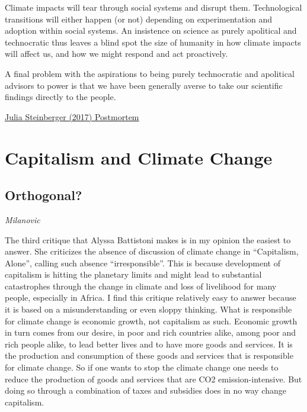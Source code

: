 \documentclass[
]{book}
\begin{document}
Climate impacts will tear through social systems and disrupt them. Technological transitions will either happen (or not) depending on experimentation and adoption within social systems. An insistence on science as purely apolitical and technocratic thus leaves a blind spot the size of humanity in how climate impacts will affect us, and how we might respond and act proactively.

A final problem with the aspirations to being purely technocratic and apolitical advisors to power is that we have been generally averse to take our scientific findings directly to the people.

\href{https://medium.com/age-of-awareness/a-postmortem-for-survival-on-science-failure-and-action-on-climate-change-35636c79971e}{Julia Steinberger (2017) Postmortem}

\hypertarget{capitalism-and-climate-change}{%
\chapter{Capitalism and Climate Change}\label{capitalism-and-climate-change}}

\hypertarget{orthogonal}{%
\section{Orthogonal?}\label{orthogonal}}

\emph{Milanovic}

The third critique that Alyssa Battistoni makes is in my opinion the easiest to answer. She criticizes the absence of discussion of climate change in ``Capitalism, Alone'', calling such absence ``irresponsible''. This is because development of capitalism is hitting the planetary limits and might lead to substantial catastrophes through the change in climate and loss of livelihood for many people, especially in Africa. I find this critique relatively easy to answer because it is based on a misunderstanding or even sloppy thinking. What is responsible for climate change is economic growth, not capitalism as such. Economic growth in turn comes from our desire, in poor and rich countries alike, among poor and rich people alike, to lead better lives and to have more goods and services. It is the production and consumption of these goods and services that is responsible for climate change. So if one wants to stop the climate change one needs to reduce the production of goods and services that are CO2 emission-intensive. But doing so through a combination of taxes and subsidies does in no way change capitalism.
\end{document}
